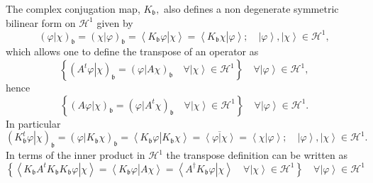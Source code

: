 \documentclass[aps,preprint]{revtex4}%
\begin{document}
The complex conjugation map, $K_{\mathfrak{b}},$ also defines a non degenerate
symmetric bilinear form on $\mathcal{H}^{1}$ given by
\begin{equation}
\left(  \left.  \varphi\right\vert \chi\right)  _{\mathfrak{b}}=\left(
\left.  \chi\right\vert \varphi\right)  _{\mathfrak{b}}=\left\langle \left.
K_{\mathfrak{b}}\varphi\right\vert \chi\right\rangle =\left\langle \left.
K_{\mathfrak{b}}\chi\right\vert \varphi\right\rangle ;\quad\left\vert
\varphi\right\rangle ,\left\vert \chi\right\rangle \in\mathcal{H}^{1},
\end{equation}
which allows one to define the transpose of an operator as
\begin{equation}
\left\{  \left(  \left.  A^{t}\varphi\right\vert \chi\right)  _{\mathfrak{b}%
}=\left(  \left.  \varphi\right\vert A\chi\right)  _{\mathfrak{b}}\quad
\forall\left\vert \chi\right\rangle \in\mathcal{H}^{1}\right\}  \quad
\forall\left\vert \varphi\right\rangle \in\mathcal{H}^{1},
\end{equation}
hence
\begin{equation}
\left\{  \left(  \left.  A\varphi\right\vert \chi\right)  _{\mathfrak{b}%
}=\left(  \left.  \varphi\right\vert A^{t}\chi\right)  _{\mathfrak{b}}%
\quad\forall\left\vert \chi\right\rangle \in\mathcal{H}^{1}\right\}
\quad\forall\left\vert \varphi\right\rangle \in\mathcal{H}^{1}.
\end{equation}
In particular
\begin{equation}
\left(  \left.  K_{\mathfrak{b}}^{t}\varphi\right\vert \chi\right)
_{\mathfrak{b}}=\left(  \left.  \varphi\right\vert K_{\mathfrak{b}}%
\chi\right)  _{\mathfrak{b}}=\left\langle \left.  K_{\mathfrak{b}}%
\varphi\right\vert K_{\mathfrak{b}}\chi\right\rangle =\overline{\left\langle
\left.  \varphi\right\vert \chi\right\rangle }=\left\langle \left.
\chi\right\vert \varphi\right\rangle ;\quad\left\vert \varphi\right\rangle
,\left\vert \chi\right\rangle \in\mathcal{H}^{1}.
\end{equation}
In terms of the inner product in $\mathcal{H}^{1}$ the transpose definition
can be written as
\begin{equation}
\left\{  \left\langle \left.  K_{\mathfrak{b}}A^{t}K_{\mathfrak{b}%
}K_{\mathfrak{b}}\varphi\right\vert \chi\right\rangle =\left\langle \left.
K_{\mathfrak{b}}\varphi\right\vert A\chi\right\rangle =\left\langle \left.
A^{\dagger}K_{\mathfrak{b}}\varphi\right\vert \chi\right\rangle \quad
\forall\left\vert \chi\right\rangle \in\mathcal{H}^{1}\right\}  \quad
\forall\left\vert \varphi\right\rangle \in\mathcal{H}^{1}%
\end{equation}
\end{document}

